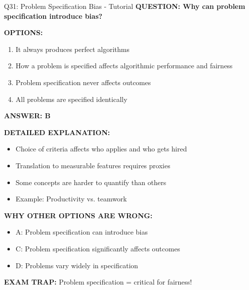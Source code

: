 \documentclass[8pt]{beamer}
\begin{document}
	\begin{frame}{Q31: Problem Specification Bias - Tutorial}
		\fontsize{6.5}{7.5}\selectfont
		\textbf{QUESTION: Why can problem specification introduce bias?}
		
		\vspace{0.1cm}
		\textbf{OPTIONS:}
		\begin{enumerate}
			\item It always produces perfect algorithms
			\item How a problem is specified affects algorithmic performance and fairness
			\item Problem specification never affects outcomes
			\item All problems are specified identically
		\end{enumerate}
		
		\vspace{0.1cm}
		\textcolor{myblue}{\textbf{ANSWER: B}}
		
		\vspace{0.1cm}
		\textbf{DETAILED EXPLANATION:}
		\begin{itemize}
			\item Choice of criteria affects who applies and who gets hired
			\item Translation to measurable features requires proxies
			\item Some concepts are harder to quantify than others
			\item Example: Productivity vs. teamwork
		\end{itemize}
		
		\vspace{0.1cm}
		\textcolor{myred}{\textbf{WHY OTHER OPTIONS ARE WRONG:}}
		\begin{itemize}
			\item \textcolor{myred}{A:} Problem specification can introduce bias
			\item \textcolor{myred}{C:} Problem specification significantly affects outcomes
			\item \textcolor{myred}{D:} Problems vary widely in specification
		\end{itemize}
		
		\textcolor{myred}{\textbf{EXAM TRAP:}} Problem specification = \textcolor{myblue}{critical for fairness}!
	\end{frame}
	
\end{document}
